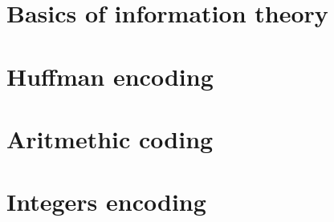 \documentclass[moon, colormath]{lectures2}
\begin{document}
    \section{Basics of information theory}
    

    \section{Huffman encoding}
    

    \section{Aritmethic coding}
    

    \section{Integers encoding}
    
    \clearpage\printbibliography
    \clearpage\printglossaries
\end{document}

